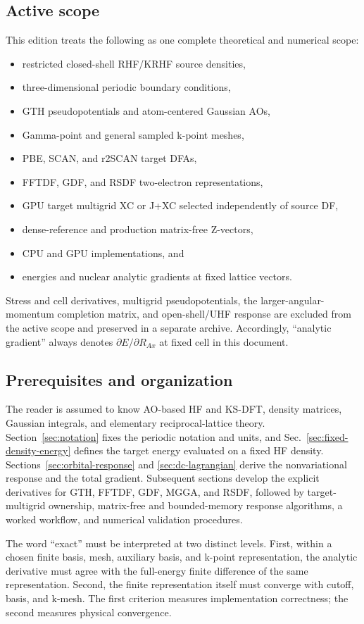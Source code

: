 \subsection{Active scope}

This edition treats the following as one complete theoretical and numerical
scope:
\begin{itemize}
  \item restricted closed-shell RHF/KRHF source densities,
  \item three-dimensional periodic boundary conditions,
  \item GTH pseudopotentials and atom-centered Gaussian AOs,
  \item Gamma-point and general sampled k-point meshes,
  \item PBE, SCAN, and r2SCAN target DFAs,
  \item FFTDF, GDF, and RSDF two-electron representations,
  \item GPU target multigrid XC or J+XC selected independently of source DF,
  \item dense-reference and production matrix-free Z-vectors,
  \item CPU and GPU implementations, and
  \item energies and nuclear analytic gradients at fixed lattice vectors.
\end{itemize}

Stress and cell derivatives, multigrid pseudopotentials, the larger-angular-momentum
completion matrix, and open-shell/UHF response are excluded from the active
scope and preserved in a separate archive.  Accordingly, ``analytic gradient''
always denotes $\partial E/\partial R_{Ax}$ at fixed cell in this document.

\subsection{Prerequisites and organization}

The reader is assumed to know AO-based HF and KS-DFT, density matrices,
Gaussian integrals, and elementary reciprocal-lattice theory.
Section~\ref{sec:notation} fixes the periodic notation and units, and
Sec.~\ref{sec:fixed-density-energy} defines the target energy evaluated on a
fixed HF density.  Sections~\ref{sec:orbital-response} and
\ref{sec:dc-lagrangian} derive the nonvariational response and the total
gradient.  Subsequent sections develop the explicit derivatives for GTH,
FFTDF, GDF, MGGA, and RSDF, followed by target-multigrid ownership,
matrix-free and bounded-memory response algorithms, a worked workflow, and
numerical validation procedures.

The word ``exact'' must be interpreted at two distinct levels.  First, within
a chosen finite basis, mesh, auxiliary basis, and k-point representation, the
analytic derivative must agree with the full-energy finite difference of the
same representation.  Second, the finite representation itself must converge
with cutoff, basis, and k-mesh.  The first criterion measures implementation
correctness; the second measures physical convergence.
